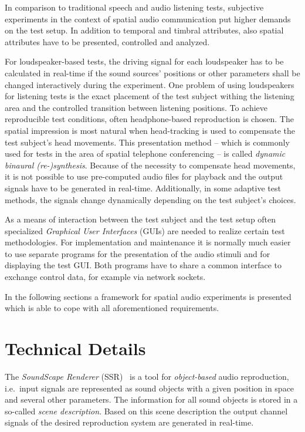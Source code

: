 \documentclass[a4paper]{article}
\begin{document}
In comparison to traditional speech and audio listening tests, subjective
experiments in the context of spatial audio communication put higher demands on
the test setup. In addition to temporal and timbral attributes, also spatial
attributes have to be presented, controlled and analyzed.

For loudspeaker-based tests, the driving signal for each loudspeaker has to be
calculated in real-time if the sound sources' positions or other parameters
shall be changed interactively during the experiment.
One problem of using loudspeakers for listening tests is the exact placement of
the test subject withing the listening area and the controlled transition
between listening positions.
To achieve reproducible test conditions, often headphone-based reproduction is
chosen. The spatial impression is most natural when head-tracking is used to
compensate the test subject's head movements. This presentation
method -- which is commonly used for tests in the area of spatial telephone
conferencing -- is called \emph{dynamic binaural \mbox{(re-)}synthesis}.
Because of the necessity to compensate head movements, it is not possible to use
pre-computed audio files for playback and the output signals have to be
generated in real-time.
Additionally, in some adaptive test methods, the signals change dynamically
depending on the test subject's choices.

As a means of interaction between the test subject and the test setup often
specialized \emph{Graphical User Interfaces} (GUIs) are needed to realize
certain test methodologies.
For implementation and maintenance it is normally much easier to use separate
programs for the presentation of the audio stimuli and for displaying the test
GUI.
Both programs have to share a common interface to exchange control data, for
example via network sockets.

In the following sections a framework for spatial audio experiments is presented
which is able to cope with all aforementioned requirements.

\section{Technical Details}

The \emph{SoundScape Renderer} (SSR)~\cite{Geier2008SSR} is a tool for
\emph{object-based}
audio reproduction, i.e.\ input signals are
represented as sound objects with a given position in space and several other
parameters. The information for all sound objects is
stored in a so-called \emph{scene description}. Based on this scene description
the output channel signals of the desired reproduction system are generated in
real-time.
\end{document}
